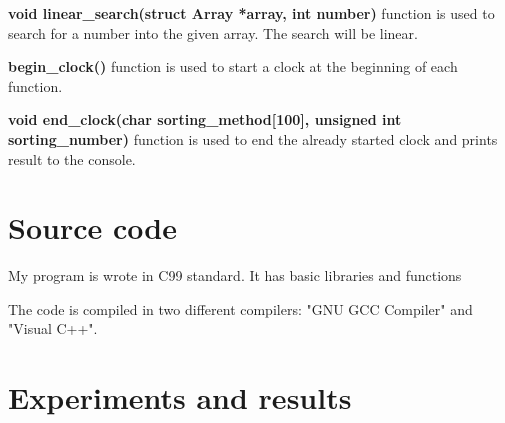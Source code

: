 \documentclass{article}
\begin{document}
{\bf void linear\_search(struct Array *array, int number)} function is used to search for a number into the given array. The search will be linear. 

{\bf begin\_clock()} function is used to start a clock at the beginning of each function. 


{\bf void end\_clock(char sorting\_method[100], unsigned int sorting\_number)} function is used to end the already started clock and prints result to the console. 





\section{Source code}
\textbf{}
\indent My program is wrote in C99 standard. It has basic libraries and functions

The code is compiled in two different compilers: "GNU GCC Compiler" and "Visual C++".


\pagebreak
\section{Experiments and results}
\end{document}
